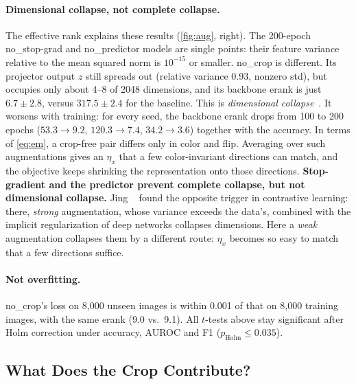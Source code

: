 \documentclass[10pt,twocolumn,letterpaper]{article}
\begin{document}
\paragraph{Dimensional collapse, not complete collapse.}
The effective rank explains these results (\cref{fig:aug}, right).
The 200-epoch no\_stop-grad and no\_predictor models are single points: their feature variance relative to the mean squared norm is $10^{-15}$ or smaller.
no\_crop is different. Its projector output $z$ still spreads out (relative variance 0.93, nonzero std), but occupies only about 4--8 of 2048 dimensions, and its backbone erank is just $6.7\pm2.8$, versus $317.5\pm2.4$ for the baseline.
This is \emph{dimensional collapse}~\cite{jing2022dimensional}.
It worsens with training: for every seed, the backbone erank drops from 100 to 200 epochs ($53.3\rightarrow9.2$, $120.3\rightarrow7.4$, $34.2\rightarrow3.6$) together with the accuracy.
In terms of \cref{eq:em}, a crop-free pair differs only in color and flip. Averaging over such augmentations gives an $\eta_x$ that a few color-invariant directions can match, and the objective keeps shrinking the representation onto those directions.
\textbf{Stop-gradient and the predictor prevent complete collapse, but not dimensional collapse.}
Jing \etal~\cite{jing2022dimensional} found the opposite trigger in contrastive learning: there, \emph{strong} augmentation, whose variance exceeds the data's, combined with the implicit regularization of deep networks collapses dimensions.
Here a \emph{weak} augmentation collapses them by a different route: $\eta_x$ becomes so easy to match that a few directions suffice.

\paragraph{Not overfitting.}
no\_crop's loss on 8,000 unseen images is within 0.001 of that on 8,000 training images, with the same erank (9.0 vs.\ 9.1).
All $t$-tests above stay significant after Holm correction under accuracy, AUROC and F1 ($p_\text{Holm}\le0.035$).

\subsection{What Does the Crop Contribute?}
\label{sec:exp_crop}
\end{document}
